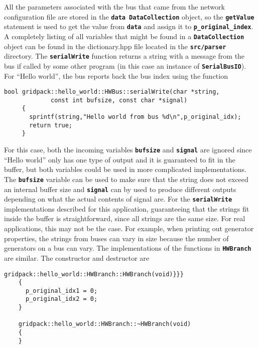 All the parameters associated with the bus that came from the network configuration file are stored in the \texttt{\textbf{data DataCollection}} object, so the \texttt{\textbf{getValue}} statement is used to get the value from \texttt{\textbf{data}} and assign it to \texttt{\textbf{p\_original\_index}}. A completely listing of all variables that might be found in a \texttt{\textbf{DataCollection}} object can be found in the dictionary.hpp file located in the \texttt{\textbf{src/parser}} directory.
The \texttt{\textbf{serialWrite}} function returns a string with a message from the bus if called by some other program (in this case an instance of \texttt{\textbf{SerialBusIO}}). For ``Hello world'', the bus reports back the bus index using the function

{
\color{red}
\begin{Verbatim}[fontseries=b]
     bool gridpack::hello_world::HWBus::serialWrite(char *string,
             const int bufsize, const char *signal)
     {
       sprintf(string,"Hello world from bus %d\n",p_original_idx);
       return true;
     }
\end{Verbatim}
}

For this case, both the incoming variables \texttt{\textbf{bufsize}} and \texttt{\textbf{signal}} are ignored since ``Hello world'' only has one type of output and it is guaranteed to fit in the buffer, but both variables could be used in more complicated implementations. The \texttt{\textbf{bufsize}} variable can be used to make sure that the string does not exceed an internal buffer size and \texttt{\textbf{signal}} can by used to produce different outputs depending on what the actual contents of signal are. For the \texttt{\textbf{serialWrite}} implementations described for this application, guaranteeing that the strings fit inside the buffer  is straightforward, since all strings are the same size. For real applications, this may not be the case. For example, when printing out generator properties, the strings from buses can vary in size because the number of generators on a bus can vary.
The implementations of the functions in \texttt{\textbf{HWBranch}} are similar. The constructor and destructor are

{
\color{red}
\begin{Verbatim}[fontseries=b]
    gridpack::hello_world::HWBranch::HWBranch(void)}}}
    {
      p_original_idx1 = 0;
      p_original_idx2 = 0;
    }

    gridpack::hello_world::HWBranch::~HWBranch(void)
    {
    }
\end{Verbatim}
}

